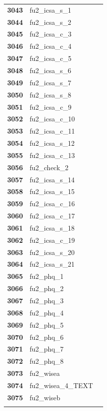 \documentclass[
  letterpaper,
  DIV=11,
  numbers=noendperiod]{scrartcl}
\begin{document}
\begin{longtable}[t]{>{}cll}
\textbf{3043} & fu2\_icsa\_s\_1 & \\
\textbf{3044} & fu2\_icsa\_s\_2 & \\
\textbf{3045} & fu2\_icsa\_c\_3 & \\
\addlinespace
\textbf{3046} & fu2\_icsa\_c\_4 & \\
\textbf{3047} & fu2\_icsa\_c\_5 & \\
\textbf{3048} & fu2\_icsa\_s\_6 & \\
\textbf{3049} & fu2\_icsa\_s\_7 & \\
\textbf{3050} & fu2\_icsa\_s\_8 & \\
\addlinespace
\textbf{3051} & fu2\_icsa\_c\_9 & \\
\textbf{3052} & fu2\_icsa\_c\_10 & \\
\textbf{3053} & fu2\_icsa\_c\_11 & \\
\textbf{3054} & fu2\_icsa\_s\_12 & \\
\textbf{3055} & fu2\_icsa\_c\_13 & \\
\addlinespace
\textbf{3056} & fu2\_check\_2 & \\
\textbf{3057} & fu2\_icsa\_s\_14 & \\
\textbf{3058} & fu2\_icsa\_s\_15 & \\
\textbf{3059} & fu2\_icsa\_c\_16 & \\
\textbf{3060} & fu2\_icsa\_c\_17 & \\
\addlinespace
\textbf{3061} & fu2\_icsa\_s\_18 & \\
\textbf{3062} & fu2\_icsa\_c\_19 & \\
\textbf{3063} & fu2\_icsa\_s\_20 & \\
\textbf{3064} & fu2\_icsa\_s\_21 & \\
\textbf{3065} & fu2\_phq\_1 & \\
\addlinespace
\textbf{3066} & fu2\_phq\_2 & \\
\textbf{3067} & fu2\_phq\_3 & \\
\textbf{3068} & fu2\_phq\_4 & \\
\textbf{3069} & fu2\_phq\_5 & \\
\textbf{3070} & fu2\_phq\_6 & \\
\addlinespace
\textbf{3071} & fu2\_phq\_7 & \\
\textbf{3072} & fu2\_phq\_8 & \\
\textbf{3073} & fu2\_wisea & \\
\textbf{3074} & fu2\_wisea\_4\_TEXT & \\
\textbf{3075} & fu2\_wiseb & \\
\addlinespace

\end{longtable}
\end{document}

